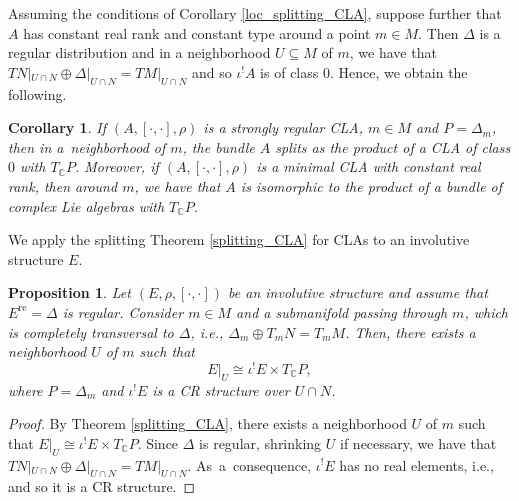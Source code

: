 \documentclass[pdftex]{sigma}
\numberwithin{equation}{section}
\newtheorem{Corollary}[Theorem]{Corollary}
\newtheorem{Proposition}[Theorem]{Proposition}
 { \theoremstyle{definition}
\newtheorem{Definition}[Theorem]{Definition}
\newtheorem{Note}[Theorem]{Note}
\newtheorem{Example}[Theorem]{Example}
\newtheorem{Examples}[Theorem]{Examples}
\newtheorem{Remark}[Theorem]{Remark} }
\newcommand{\C}{{\mathbb{C}}}
\DeclareMathOperator{\real}{re}
\begin{document}
Assuming the conditions of Corollary \ref{loc_splitting_CLA}, suppose further that $A$ has constant real rank and constant type around a point $m\in M$. Then $\Delta$ is a regular distribution and in a neighborhood $U\subseteq M$ of $m$, we have that
$TN|_{U\cap N}\oplus \Delta|_{U\cap N}=TM|_{U\cap N}$ and so $\iota^! A$ is of class $0$. Hence, we obtain the following.
\begin{Corollary}
If $(A,[\cdot,\cdot],\rho)$ is a strongly regular CLA, $m\in M$ and $P=\Delta_m$, then in a~neighborhood of $m$, the bundle $A$ splits as the product of a CLA of class $0$ with $T_{\C}P$. Moreover, if $(A,[\cdot,\cdot],\rho)$ is a minimal CLA with constant real rank, then around $m$, we have that $A$ is isomorphic to the product of a bundle of complex Lie algebras with $T_{\C}P$.
\end{Corollary}

\begin{Example}%
We apply the splitting Theorem \ref{splitting_CLA} for CLAs to an involutive structure $E$.
\end{Example}

\begin{Proposition}\label{loc_str_inv_st}
 Let $(E,\rho, [\cdot,\cdot])$ be an involutive structure and assume that $E^{\real}=\Delta$ is regular. Consider $m\in M$ and a submanifold  passing through $m$, which is completely transversal to $\Delta$, i.e., $\Delta_m\oplus T_m N=T_m M$. Then, there exists a neighborhood $U$ of $m$ such that
\[
E|_U\cong \iota^! E\times T_{\C}P,
\]
where $P=\Delta_m$ and $\iota^{!} E$ is a CR structure over $U\cap N$.
\end{Proposition}
\begin{proof}
By Theorem \ref{splitting_CLA}, there exists a neighborhood $U$ of $m$ such that $E|_U\cong \iota^! E\times T_{\C}P$. Since $\Delta$ is regular, shrinking $U$ if necessary, we have that $TN|_{U\cap N}\oplus \Delta|_{U\cap N}=TM|_{U\cap N}$. As~a~consequence, $\iota^! E$ has no real elements, i.e.,  and so it is a CR structure.
\end{proof}
\end{document}
